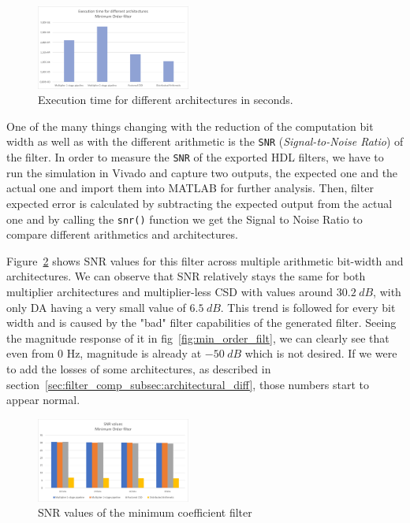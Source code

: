\begin{figure}[htbp]
	\centering
	\includegraphics[width=0.45\textwidth]{../Images/FIR_min_Order/exec_time_32bits.png}
	\caption{Execution time for different architectures in seconds.}
	\label{fig:exec_time_min_32b}
\end{figure}

One of the many things changing with the reduction of the computation bit width as well as with the different arithmetic is the \verb|SNR| (\textit{Signal-to-Noise Ratio}) of the filter.
In order to measure the \verb|SNR| of the exported HDL filters, we have to run the simulation in Vivado and capture two outputs, the expected one and the actual one and import them into MATLAB for further analysis.
Then, filter expected error is calculated by subtracting the expected output from the actual one and by calling the \verb|snr()| function we get the Signal to Noise Ratio to compare different arithmetics and architectures.

Figure~\ref{fig:fir_min_snr} shows SNR values for this filter across multiple arithmetic bit-width and architectures. We can observe that SNR relatively stays the same for both multiplier architectures and multiplier-less CSD with values around $30.2 \hspace{3pt} dB$, with only DA having a very small value of $6.5 \hspace{3pt} dB$.
This trend is followed for every bit width and is caused by the "bad" filter capabilities of the generated filter. Seeing the magnitude response of it in fig~\ref{fig:min_order_filt}, we can clearly see that even from $0$ Hz, magnitude is already at $-50 \hspace{3pt} dB$ which is not desired. If we were to add the losses of some architectures, as described in section~\ref{sec:filter_comp_subsec:architectural_diff}, those numbers start to appear normal.

\begin{figure}[htbp]
	\centering
	\includegraphics[width=0.45\textwidth]{../Images/FIR_min_Order/snr_values.png}
	\caption{SNR values of the minimum coefficient filter}
	\label{fig:fir_min_snr}
\end{figure}

